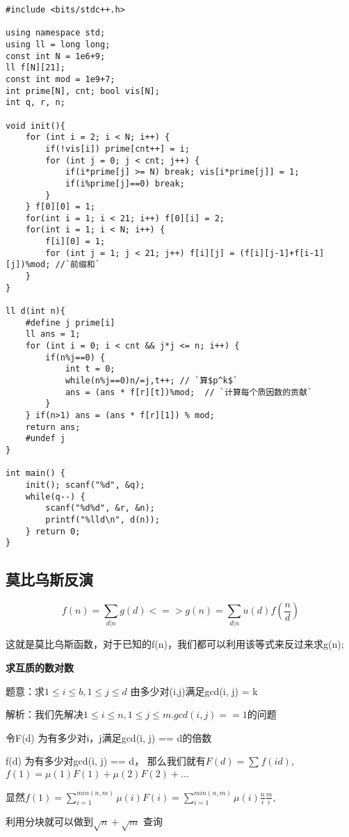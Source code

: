 \begin{lstlisting}
#include <bits/stdc++.h>

using namespace std;
using ll = long long;
const int N = 1e6+9;
ll f[N][21];
const int mod = 1e9+7;
int prime[N], cnt; bool vis[N];
int q, r, n;

void init(){
    for (int i = 2; i < N; i++) {
        if(!vis[i]) prime[cnt++] = i;
        for (int j = 0; j < cnt; j++) {
            if(i*prime[j] >= N) break; vis[i*prime[j]] = 1;
            if(i%prime[j]==0) break;
        }
    } f[0][0] = 1;
    for(int i = 1; i < 21; i++) f[0][i] = 2;
    for(int i = 1; i < N; i++) {
        f[i][0] = 1;
        for (int j = 1; j < 21; j++) f[i][j] = (f[i][j-1]+f[i-1][j])%mod; //`前缀和`
    }
}

ll d(int n){ 
    #define j prime[i]
    ll ans = 1;
    for (int i = 0; i < cnt && j*j <= n; i++) {
        if(n%j==0) {
            int t = 0;
            while(n%j==0)n/=j,t++; // `算$p^k$`
            ans = (ans * f[r][t])%mod;  // `计算每个质因数的贡献`
        }
    } if(n>1) ans = (ans * f[r][1]) % mod; 
    return ans;
    #undef j
}

int main() {
    init(); scanf("%d", &q);
    while(q--) {
        scanf("%d%d", &r, &n);
        printf("%lld\n", d(n));
    } return 0;
}
\end{lstlisting}

\subsection{莫比乌斯反演}

$$
f(n) = \sum_{d|n} g(d)  <=> g(n) =  \sum_{d|n}u(d)f(\frac{n}{d})
$$

这就是莫比乌斯函数，对于已知的f(n)，我们都可以利用该等式来反过来求g(n);

{\bfseries 求互质的数对数}

题意：求$1\le i\le b, 1\le j\le d$ 由多少对(i,j)满足gcd(i, j) = k

解析：我们先解决$1\le i\le n, 1\le j\le m. gcd(i, j)== 1$的问题

令F(d) 为有多少对i，j满足gcd(i, j) == d的倍数

f(d) 为有多少对gcd(i, j) == d， 那么我们就有$F(d) = \sum _{}f(id)$, $f(1) = \mu(1)F(1) + \mu(2)F(2)+...$

显然$f(1) = \sum_{i=1}^{min(n, m)} \mu(i) F(i)= \sum_{i=1}^{min(n, m)} \mu(i) \frac{n}{i} \frac{m}{i}$, 

利用分块就可以做到$\sqrt{n}+\sqrt{m}$ 查询

